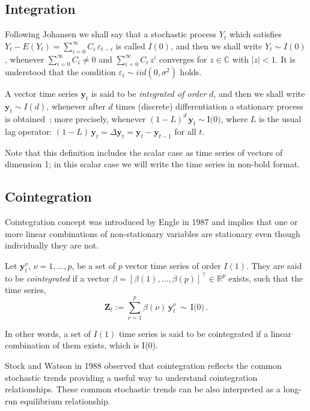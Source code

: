\subsection{Integration}

Following Johansen \cite{johansen1995} we shall say that a stochastic process
$Y_t$ which satisfies $Y_t-E(Y_t) = \sum_{i=0}^\infty C_i\,\varepsilon_{t-i}$ is
called $I(0)$, and then we shall write $Y_t\sim I(0)$, whenever
$\sum_{i=0}^\infty C_i \neq 0$ and $\sum_{i=0}^\infty C_i\,z^i$ converges for
$z\in\mathbb{C}$ with $|z|<1$.  It is understood that the condition
$\varepsilon_t\sim iid(0,\sigma^2)$ holds.

A vector time series $\mathbf{y}_t$ is said to be {\em integrated of order\/}
$d$, and then we shall write $\mathbf{y}_t\sim I(d)$, whenever after $d$ times
(discrete) differentiation a stationary process is
obtained~\cite{banerjee1993};
more precisely, whenever
$(1-L)^d\,\mathbf{y}_t\sim\text{I(0)}$, where $L$ is the usual lag operator:
$(1-L)\,\mathbf{y}_t = \Delta\mathbf{y}_t = \mathbf{y}_t-\mathbf{y}_{t-1}$ for
all $t$.  

Note that this definition includes the scalar case as time series of
vectors of dimension 1; in this scalar case we will write the time series in
non-bold format.


\subsection{Cointegration} \label{sec:cointegration}
Cointegration concept was introduced by Engle in 1987 \cite{engle1987} and
implies that one or more linear combinations of non-stationary variables are
stationary even though individually they are not.  

Let $\mathbf{y}_t^\nu$, $\nu=1,\dots,p$, be a set of $p$ vector time series of
order $I(1)$.  They are said to be {\em cointegrated\/} if a vector
$\beta=[\beta(1),\dots,\beta(p)]^\top \in \mathbb{R}^p$ exists, such that the
time series,
\begin{equation}
\mathbf{Z}_t:= 
\sum_{\nu=1}^p \beta(\nu)\,\mathbf{y}_t^\nu\,\sim\,\text{I(0)}\,.
\end{equation}

In other words, a set of $I(1)$ time series is said to be cointegrated if a
linear combination of them exists, which is I(0).

Stock and Watson in 1988 \cite{stock+watson1988} observed that
cointegration reflects the common stochastic trends providing a useful way to
understand cointegration relationships. These common stochastic trends can be
also interpreted as a long-run equilibrium relationship.


